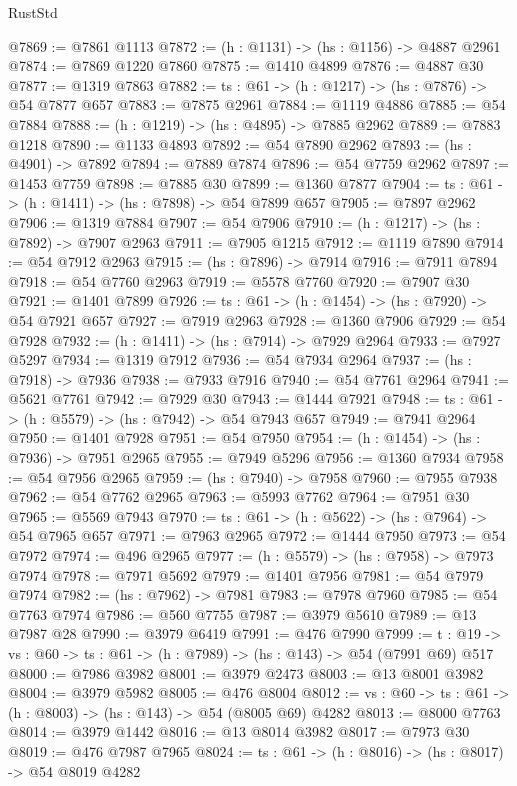 \begin{lexlean}{RustStd}
\begin{coremodule}
@7869 := @7861 @1113
@7872 := (h : @1131) -> (hs : @1156) -> @4887 @2961
@7874 := @7869 @1220 @7860
@7875 := @1410 @4899
@7876 := @4887 @30
@7877 := @1319 @7863
@7882 := {ts : @61} -> (h : @1217) -> (hs : @7876) -> @54 @7877 @657
@7883 := @7875 @2961
@7884 := @1119 @4886
@7885 := @54 @7884
@7888 := (h : @1219) -> (hs : @4895) -> @7885 @2962
@7889 := @7883 @1218
@7890 := @1133 @4893
@7892 := @54 @7890 @2962
@7893 := (hs : @4901) -> @7892
@7894 := @7889 @7874
@7896 := @54 @7759 @2962
@7897 := @1453 @7759
@7898 := @7885 @30
@7899 := @1360 @7877
@7904 := {ts : @61} -> (h : @1411) -> (hs : @7898) -> @54 @7899 @657
@7905 := @7897 @2962
@7906 := @1319 @7884
@7907 := @54 @7906
@7910 := (h : @1217) -> (hs : @7892) -> @7907 @2963
@7911 := @7905 @1215
@7912 := @1119 @7890
@7914 := @54 @7912 @2963
@7915 := (hs : @7896) -> @7914
@7916 := @7911 @7894
@7918 := @54 @7760 @2963
@7919 := @5578 @7760
@7920 := @7907 @30
@7921 := @1401 @7899
@7926 := {ts : @61} -> (h : @1454) -> (hs : @7920) -> @54 @7921 @657
@7927 := @7919 @2963
@7928 := @1360 @7906
@7929 := @54 @7928
@7932 := (h : @1411) -> (hs : @7914) -> @7929 @2964
@7933 := @7927 @5297
@7934 := @1319 @7912
@7936 := @54 @7934 @2964
@7937 := (hs : @7918) -> @7936
@7938 := @7933 @7916
@7940 := @54 @7761 @2964
@7941 := @5621 @7761
@7942 := @7929 @30
@7943 := @1444 @7921
@7948 := {ts : @61} -> (h : @5579) -> (hs : @7942) -> @54 @7943 @657
@7949 := @7941 @2964
@7950 := @1401 @7928
@7951 := @54 @7950
@7954 := (h : @1454) -> (hs : @7936) -> @7951 @2965
@7955 := @7949 @5296
@7956 := @1360 @7934
@7958 := @54 @7956 @2965
@7959 := (hs : @7940) -> @7958
@7960 := @7955 @7938
@7962 := @54 @7762 @2965
@7963 := @5993 @7762
@7964 := @7951 @30
@7965 := @5569 @7943
@7970 := {ts : @61} -> (h : @5622) -> (hs : @7964) -> @54 @7965 @657
@7971 := @7963 @2965
@7972 := @1444 @7950
@7973 := @54 @7972
@7974 := @496 @2965
@7977 := (h : @5579) -> (hs : @7958) -> @7973 @7974
@7978 := @7971 @5692
@7979 := @1401 @7956
@7981 := @54 @7979 @7974
@7982 := (hs : @7962) -> @7981
@7983 := @7978 @7960
@7985 := @54 @7763 @7974
@7986 := @560 @7755
@7987 := @3979 @5610
@7989 := @13 @7987 @28
@7990 := @3979 @6419
@7991 := @476 @7990
@7999 := {t : @19} -> {vs : @60} -> {ts : @61} -> (h : @7989) -> (hs : @143) -> @54 (@7991 @69) @517
@8000 := @7986 @3982
@8001 := @3979 @2473
@8003 := @13 @8001 @3982
@8004 := @3979 @5982
@8005 := @476 @8004
@8012 := {vs : @60} -> {ts : @61} -> (h : @8003) -> (hs : @143) -> @54 (@8005 @69) @4282
@8013 := @8000 @7763
@8014 := @3979 @1442
@8016 := @13 @8014 @3982
@8017 := @7973 @30
@8019 := @476 @7987 @7965
@8024 := {ts : @61} -> (h : @8016) -> (hs : @8017) -> @54 @8019 @4282

\end{coremodule}
\end{lexlean}
